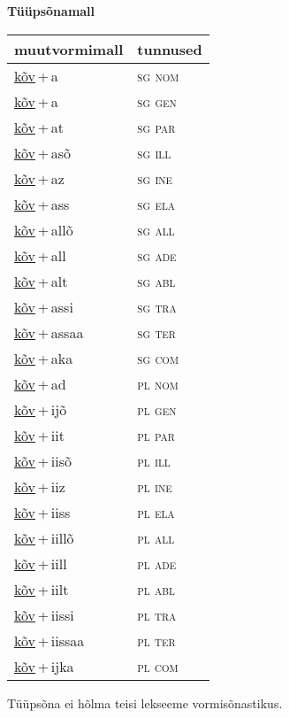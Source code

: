 
\vspace{1.8em}
\begin{minipage}{\textwidth}
\textbf{Tüüpsõnamall \,}\\

\begin{sideways}
\begin{tabular}{l l}
muutvormimall & tunnused \\
\hline
\underline{kõv}\,+\,a & \textsc{ sg nom } \\
\underline{kõv}\,+\,a & \textsc{ sg gen } \\
\underline{kõv}\,+\,at & \textsc{ sg par } \\
\underline{kõv}\,+\,asõ & \textsc{ sg ill } \\
\underline{kõv}\,+\,az & \textsc{ sg ine } \\
\underline{kõv}\,+\,ass & \textsc{ sg ela } \\
\underline{kõv}\,+\,allõ & \textsc{ sg all } \\
\underline{kõv}\,+\,all & \textsc{ sg ade } \\
\underline{kõv}\,+\,alt & \textsc{ sg abl } \\
\underline{kõv}\,+\,assi & \textsc{ sg tra } \\
\underline{kõv}\,+\,assaa & \textsc{ sg ter } \\
\underline{kõv}\,+\,aka & \textsc{ sg com } \\
\underline{kõv}\,+\,ad & \textsc{ pl nom } \\
\underline{kõv}\,+\,ijõ & \textsc{ pl gen } \\
\underline{kõv}\,+\,iit & \textsc{ pl par } \\
\underline{kõv}\,+\,iisõ & \textsc{ pl ill } \\
\underline{kõv}\,+\,iiz & \textsc{ pl ine } \\
\underline{kõv}\,+\,iiss & \textsc{ pl ela } \\
\underline{kõv}\,+\,iillõ & \textsc{ pl all } \\
\underline{kõv}\,+\,iill & \textsc{ pl ade } \\
\underline{kõv}\,+\,iilt & \textsc{ pl abl } \\
\underline{kõv}\,+\,iissi & \textsc{ pl tra } \\
\underline{kõv}\,+\,iissaa & \textsc{ pl ter } \\
\underline{kõv}\,+\,ijka & \textsc{ pl com } \\
\end{tabular}
\end{sideways}
\label{tab:tüüpsõnamall-kõva}

\end{minipage}

 
\vspace{1em}
\noindent Tüüpsõna ei hõlma teisi lekseeme vormi\-sõnastikus.
